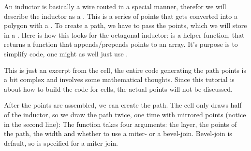 An inductor is basically a wire routed in a special manner, therefor we will describe the inductor as a . This is a series of points that gets
converted into a polygon with a . To create a path, we have to pass the points, which we will store in a . Here is how this looks
for the octagonal inductor: 
 is a helper function, that returns a function that appends/prepends points to an array. It's purpose is to simplify code, one
might as well just use .

This is just an excerpt from the cell, the entire code generating the path points is a bit complex and involves some mathematical thoughts. Since this tutorial is
about how to build the code for cells, the actual points will not be discussed.

After the points are assembled, we can create the path. The cell only draws half of the inductor, so we draw the path twice, one time with mirrored points (notice
 in the second line):
The  function takes four arguments: the layer, the points of the path, the width and whether to use a miter- or a bevel-join. Bevel-join is
default, so  is specified for a miter-join.

